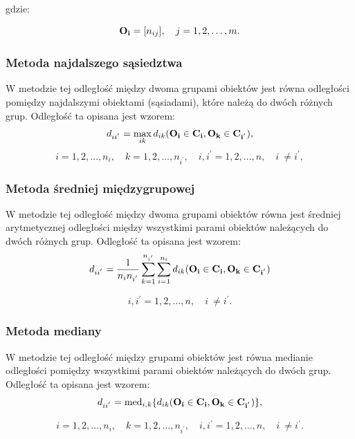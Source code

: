 \documentclass[12pt,a4paper]{report}
\newcommand{\mediana}{\operatorname{med}}
\begin{document}
gdzie:

$$
\bold{O_{i}}=[n_{ij}], \quad j=1,2,\dots,m.
$$

\subsubsection{Metoda najdalszego sąsiedztwa}


W metodzie tej odległość między dwoma grupami obiektów jest równa odległości pomiędzy najdalszymi obiektami (sąsiadami), które należą do dwóch różnych grup. Odległość ta opisana jest wzorem: 
$$
d_{ii^{'}}= \max\limits_{ik} {d_{ik}(\bf{O_i} \in C_{i}, O_{k} \in C_{i^{'}})},
$$
$$
i=1,2,\dots,n_{i}, \quad k=1,2,\dots,n_{i^{'}}, \quad i,i^{'}=1,2,\dots,n, \quad i~\neq i^{'}, 
$$


\subsubsection{Metoda średniej międzygrupowej}


W metodzie tej odległość między dwoma grupami obiektów równa jest średniej arytmetycznej odległości między wszystkimi parami obiektów należących do dwóch różnych grup. Odległość ta opisana jest wzorem: 
$$
d_{ii^{'}}=\frac{1}{n_{i}n_{i^{'}}}\sum_{k=1}^{n_{i^{'}}}\sum_{i=1}^{n_{i}} d_{ik}(\bf{O_i} \in C_{i}, O_{k} \in C_{i^{'}})
$$

$$i,i^{'}=1,2,\dots,n, \quad i~\neq i^{'}. $$


\subsubsection{Metoda mediany}


W metodzie tej odległość między grupami obiektów jest równa medianie odległości pomiędzy wszystkimi parami obiektów należących do dwóch grup. Odległość ta opisana jest wzorem: 
$$
d_{ii^{'}}= \mediana_{i,k} \{d_{ik}(\bf{O_i} \in C_{i}, O_{k} \in C_{i^{'}})\},
$$

$$i=1,2,\dots,n_{i}, \quad k=1,2,\dots,n_{i^{'}}, \quad i,i^{'}=1,2,\dots,n, \quad i~\neq i^{'}. $$
\end{document}
